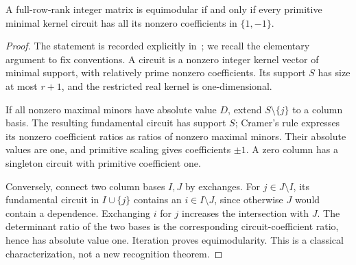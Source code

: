 \begin{lemma}\label{lem:circuits}
A full-row-rank integer matrix is equimodular if and only if every primitive minimal kernel circuit has all its nonzero coefficients in \(\{1,-1\}\).
\end{lemma}
\begin{proof}
The statement is recorded explicitly in~\cite[Definition 1.1(2)--(3)]{BS}; we recall the elementary argument to fix conventions. A circuit is a nonzero integer kernel vector of minimal support, with relatively prime nonzero coefficients. Its support \(S\) has size at most \(r+1\), and the restricted real kernel is one-dimensional.

If all nonzero maximal minors have absolute value \(D\), extend \(S\setminus\{j\}\) to a column basis. The resulting fundamental circuit has support \(S\); Cramer's rule expresses its nonzero coefficient ratios as ratios of nonzero maximal minors. Their absolute values are one, and primitive scaling gives coefficients \(\pm1\). A zero column has a singleton circuit with primitive coefficient one.

Conversely, connect two column bases \(I,J\) by exchanges. For \(j\in J\setminus I\), its fundamental circuit in \(I\cup\{j\}\) contains an \(i\in I\setminus J\), since otherwise \(J\) would contain a dependence. Exchanging \(i\) for \(j\) increases the intersection with \(J\). The determinant ratio of the two bases is the corresponding circuit-coefficient ratio, hence has absolute value one. Iteration proves equimodularity. This is a classical characterization, not a new recognition theorem.
\end{proof}

